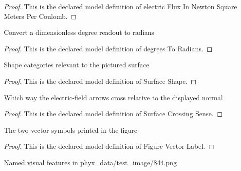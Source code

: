 \begin{proof}
  This is the declared model definition of electric Flux In Newton Square Meters Per Coulomb.
\end{proof}
\begin{definition}
  \label{def:physics:phyx-mini-0844:phyxminiproblems-problemphyxmini0844-degreestoradians}
  Convert a dimensionless degree readout to radians
\end{definition}
\begin{proof}
  This is the declared model definition of degrees To Radians.
\end{proof}
\begin{definition}
  \label{def:physics:phyx-mini-0844:phyxminiproblems-problemphyxmini0844-surfaceshape}
  Shape categories relevant to the pictured surface
\end{definition}
\begin{proof}
  This is the declared model definition of Surface Shape.
\end{proof}
\begin{definition}
  \label{def:physics:phyx-mini-0844:phyxminiproblems-problemphyxmini0844-surfacecrossingsense}
  Which way the electric-field arrows cross relative to the displayed normal
\end{definition}
\begin{proof}
  This is the declared model definition of Surface Crossing Sense.
\end{proof}
\begin{definition}
  \label{def:physics:phyx-mini-0844:phyxminiproblems-problemphyxmini0844-figurevectorlabel}
  The two vector symbols printed in the figure
\end{definition}
\begin{proof}
  This is the declared model definition of Figure Vector Label.
\end{proof}
\begin{definition}
  \label{def:physics:phyx-mini-0844:phyxminiproblems-problemphyxmini0844-figurefeature}
  Named visual features in phyx\_data/test\_image/844.png
\end{definition}
